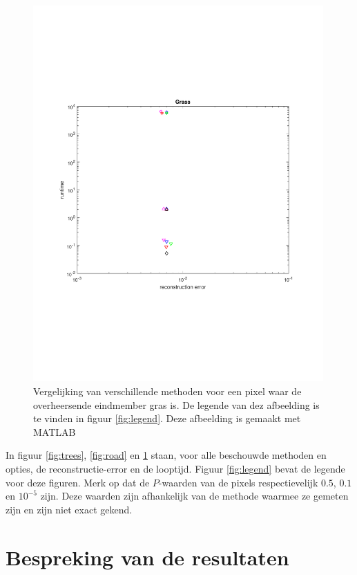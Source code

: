 \documentclass[12pt]{report}
\begin{document}
\begin{figure}
\includegraphics[width=0.99\textwidth,trim=0 200 0 175 cm]{plot_grass.pdf}
\caption{Vergelijking van verschillende methoden voor een pixel waar de overheersende eindmember gras is. De legende van dez afbeelding is te vinden in figuur \ref{fig:legend}. Deze afbeelding is gemaakt met MATLAB\cite{matlab} \label{fig:grass}}
\end{figure}



In figuur \ref{fig:trees}, \ref{fig:road} en \ref{fig:grass} staan, voor alle beschouwde methoden en opties, de reconstructie-error en de looptijd. Figuur \ref{fig:legend} bevat de legende voor deze figuren. Merk op dat de $P$-waarden van de pixels respectievelijk $0.5$, $0.1$ en $10^{-5}$ zijn. Deze waarden zijn afhankelijk van de methode waarmee ze gemeten zijn en zijn niet exact gekend. 


\section{Bespreking van de resultaten}
\end{document}
